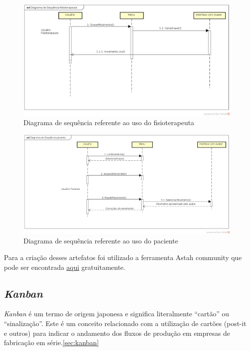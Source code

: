 \begin{figure}[H]
\centering
\includegraphics [keepaspectratio=true,scale=0.45]{figuras/diagramaFisio.eps}

\caption{Diagrama de sequência referente ao uso do fisioterapeuta}
\label{diagramaFisio}
\end{figure}


\begin{figure}[H]
\centering
\includegraphics [keepaspectratio=true,scale=0.45]{figuras/diagramaPaciente.eps}

\caption{Diagrama de sequência referente ao uso do paciente}
\label{diagramaPaciente}
\end{figure}

  Para a criação desses artefatos foi utilizado a ferramenta Astah community que pode ser encontrada \href{http://astah.net/download#community}{aqui} gratuitamente.


\subsection{\textit{Kanban}}\label{sub:kanban}
  \textit{Kanban} é um termo de origem japonesa e significa literalmente “cartão” ou “sinalização”.
Este é um conceito relacionado com a utilização de cartões (post-it e outros) para indicar o andamento dos fluxos de produção em empresas de fabricação em série.\ref{sec:kanban}

